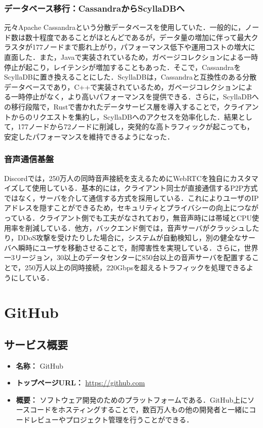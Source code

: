 \documentclass[a4paper,12pt]{article}
\begin{document}
\subsubsection{データベース移行：CassandraからScyllaDBへ}

元々Apache Cassandraという分散データベースを使用していた\cite{discord-stores-trillions}．一般的に，ノード数は数十程度であることがほとんどであるが，データ量の増加に伴って最大クラスタが177ノードまで膨れ上がり，パフォーマンス低下や運用コストの増大に直面した．また，Javaで実装されているため，ガベージコレクションによる一時停止が起こり，レイテンシが増加することもあった．そこで，CassandraをScyllaDBに置き換えることにした．ScyllaDBは，Cassandraと互換性のある分散データベースであり，C++で実装されているため，ガベージコレクションによる一時停止がなく，より高いパフォーマンスを提供できる\cite{discord-infoq-scylladb}．さらに，ScyllaDBへの移行段階で，Rustで書かれたデータサービス層を導入することで，クライアントからのリクエストを集約し，ScyllaDBへのアクセスを効率化した\cite{discord-rust-elixir}．結果として，177ノードから72ノードに削減し，突発的な高トラフィックが起こっても，安定したパフォーマンスを維持できるようになった．

\subsubsection{音声通信基盤}

Discordでは，250万人の同時音声接続を支えるためにWebRTCを独自にカスタマイズして使用している．基本的には，クライアント同士が直接通信するP2P方式ではなく，サーバを介して通信する方式を採用している．これによりユーザのIPアドレスを隠すことができるため，セキュリティとプライバシーの向上につながっている\cite{discord-voice-webrtc}．クライアント側でも工夫がなされており，無音声時には帯域とCPU使用率を削減している．他方，バックエンド側では，音声サーバがクラッシュしたり，DDoS攻撃を受けたりした場合に，システムが自動検知し，別の健全なサーバへ瞬時にユーザを移動させることで，耐障害性を実現している．さらに，世界一3リージョン，30以上のデータセンターに850台以上の音声サーバを配置することで，250万人以上の同時接続，220Gbpsを超えるトラフィックを処理できるようにしている．

\section{GitHub}

\subsection{サービス概要}
\begin{itemize}
  \item \textbf{名称：} GitHub
  \item \textbf{トップページURL：} \url{https://github.com}
  \item \textbf{概要：} ソフトウェア開発のためのプラットフォームである．GitHub上にソースコードをホスティングすることで，数百万人もの他の開発者と一緒にコードレビューやプロジェクト管理を行うことができる．
\end{itemize}
\end{document}
